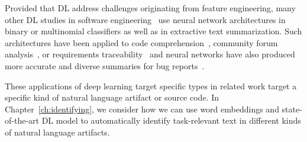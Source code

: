 Provided that \acs{DL} address challenges originating from feature engineering, 
many other \acs{DL} studies in software engineering~\cite{ferreira2021,li2018deep, watson2022}
use neural network architectures 
in binary or multinomial classifiers as well as in extractive text summarization.
Such architectures have been applied to 
code comprehension~\cite{allamanis2015, mi2018}, 
community forum analysis~\cite{Lin2018, wang2019}, 
or requirements traceability~\cite{chen2019, guo2017}
and neural networks have also produced more accurate and diverse summaries 
for bug reports~\cite{li2018deep}.



These applications of deep learning target specific
types in related work target a specific kind of natural
language artifact or source code. 
In Chapter~\ref{ch:identifying}, we consider 
how we can use 
word embeddings and state-of-the-art \acs{DL}
model 
to automatically identify task-relevant text
in different kinds of natural language artifacts.

